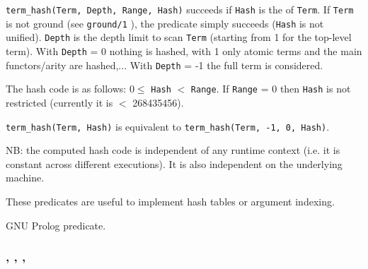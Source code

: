 \Description

\texttt{term\_hash(Term, Depth, Range, Hash)} succeeds if \texttt{Hash} is
the  of \texttt{Term}. If \texttt{Term} is not ground (see
\texttt{ground/1} ), the predicate simply succeeds
(\texttt{Hash} is not unified). \texttt{Depth} is the depth limit to scan
\texttt{Term} (starting from 1 for the top-level term). With \texttt{Depth} =
0 nothing is hashed, with 1 only atomic terms and the main functors/arity are
hashed,... With \texttt{Depth} = -1 the full term is considered.

The hash code is as follows: $0 \leq$ \texttt{Hash} $<$ \texttt{Range}. If \texttt{Range} = 0 then
\texttt{Hash} is not restricted (currently it is $<$ 268435456).

\texttt{term\_hash(Term, Hash)} is equivalent to \texttt{term\_hash(Term, -1, 0, Hash)}.

NB: the computed hash code is independent of any runtime context (i.e. it is
constant across different executions). It is also independent on the
underlying machine.

These predicates are useful to implement hash tables or argument indexing.

\begin{PlErrors}







\end{PlErrors}

\Portability

GNU Prolog predicate.

\subsubsection{, 
               , ,}

